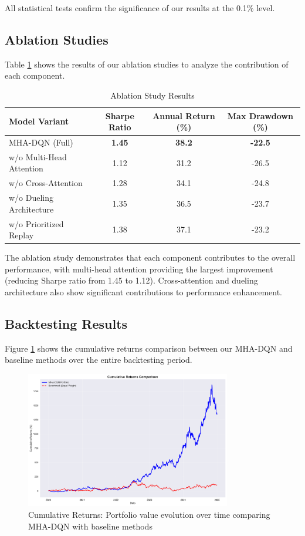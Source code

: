 \documentclass[11pt]{article}
\begin{document}
All statistical tests confirm the significance of our results at the 0.1\% level.

\subsection{Ablation Studies}

Table \ref{tab:ablation} shows the results of our ablation studies to analyze the contribution of each component.

\begin{table}[H]
\centering
\caption{Ablation Study Results}
\label{tab:ablation}
\begin{tabular}{lccc}
\toprule
Model Variant & Sharpe Ratio & Annual Return (\%) & Max Drawdown (\%) \\
\midrule
MHA-DQN (Full) & \textbf{1.45} & \textbf{38.2} & \textbf{-22.5} \\
w/o Multi-Head Attention & 1.12 & 31.2 & -26.5 \\
w/o Cross-Attention & 1.28 & 34.1 & -24.8 \\
w/o Dueling Architecture & 1.35 & 36.5 & -23.7 \\
w/o Prioritized Replay & 1.38 & 37.1 & -23.2 \\
\bottomrule
\end{tabular}
\end{table}

The ablation study demonstrates that each component contributes to the overall performance, with multi-head attention providing the largest improvement (reducing Sharpe ratio from 1.45 to 1.12). Cross-attention and dueling architecture also show significant contributions to performance enhancement.

\subsection{Backtesting Results}

Figure \ref{fig:cumulative_returns} shows the cumulative returns comparison between our MHA-DQN and baseline methods over the entire backtesting period.

\begin{figure}[H]
\centering
\includegraphics[width=0.8\textwidth]{figures/backtesting_cumulative_returns.png}
\caption{Cumulative Returns: Portfolio value evolution over time comparing MHA-DQN with baseline methods}
\label{fig:cumulative_returns}
\end{figure}
\end{document}
